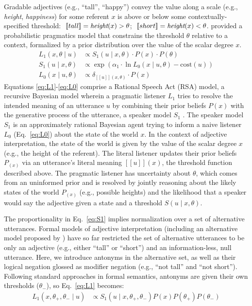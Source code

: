 \documentclass[10pt,letterpaper]{article}
\newcommand{\denote}[1]{\mbox{ $[\![ #1 ]\!]$}}
\begin{document}
Gradable adjectives (e.g., ``tall'', ``happy'') convey the value along a scale (e.g., \emph{height}, \emph{happiness}) for some referent $x$ is above or below some contextually-specified threshold: $\denote{tall} = \emph{height}(x) > \theta$; $\denote{short} = \emph{height}(x) < \theta$.
 provided a probabilistic pragmatics model that constrains the threshold $\theta$ relative to a context, formalized by a prior distribution over the value of the scalar degree $x$.  
%
\begin{align}
L_{1}(x, \theta \mid u) &\propto S_{1}(u \mid x, \theta) \cdot P(x) \cdot P(\theta) \label{eq:L1} \\
S_{1}(u \mid x, \theta) &\propto \exp{(\alpha_1 \cdot \ln {L_{0}(x \mid u, \theta)} - \text{cost}(u))} \label{eq:S1}\\
L_{0}(x \mid u, \theta) &\propto {\delta_{[\![u]\!](x, \theta)} \cdot P(x)} \label{eq:L0}
\end{align}
%
Equations \ref{eq:L1}-\ref{eq:L0} comprise a Rational Speech Act (RSA) model, a recursive Bayesian model wherein a pragmatic listener $L_1$ tries to resolve the intended meaning of an utterance $u$ by combining their prior beliefs $P(x)$ with the generative process of the utterance, a speaker model $S_1$ \cite<for a review, see>{Goodman2016:RSA}.
The speaker model $S_1$  is an approximately rational Bayesian agent trying 
to inform a naive listener $L_0$ (Eq.~\ref{eq:L0}) about the state of the world $x$.
In the context of adjective interpretation, the state of the world is given by the value of the scalar degree $x$ (e.g., the height of the referent).
The literal listener updates their prior beliefs $P_(x)$ via an utterance's literal meaning $[\![u]\!](x)$, the threshold function described above.
The pragmatic listener has uncertainty about $\theta$, which comes from an uninformed prior and is resolved by jointly reasoning about the likely states of the world $P_(x)$ (e.g., possible heights) and the likelihood that a speaker would say the adjective given a state and a threshold $S(u \mid x, \theta)$.

The proportionality in Eq.~\ref{eq:S1} implies normalization over a set of alternative utterances. 
Formal models of adjective interpretation (including an alternative model proposed by ) have so far restricted the set of alternative utterances to be only an adjective (e.g., either ``tall'' or ``short'') and an information-less, null utterance. 
Here, we introduce antonyms in the alternative set, as well as their logical negation glossed as modifier negation (e.g., ``not tall'' and ``not short''). 
Following standard approaches in formal semantics, antonyms are given their own thresholds ($\theta_-$), so Eq.~\ref{eq:L1} becomes:
%
\begin{align}
L_{1}(x, \theta_+, \theta_- \mid u) &\propto S_{1}(u \mid x, \theta_+, \theta_-)  P(x)  P(\theta_+)  P(\theta_-) \label{eq:L1a}
\end{align}
\end{document}
